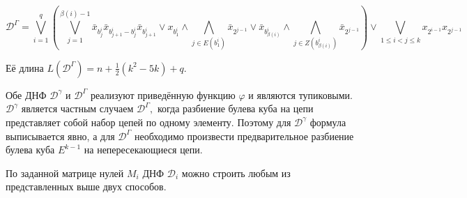 \documentclass[12pt,a4paper,oneside,fleqn,leqno]{article}
\theoremstyle{definition}
\begin{document}
			$$
				\mathcal{D}^{\Gamma} = \bigvee_{i = 1}^q \left(\bigvee_{j = 1}^{\beta(i) - 1} \bar{x}_{b_j^i} \bar{x}_{b_{j + 1}^i - b_j^i} \bar{x}_{b_{j + 1}^i} \vee x_{b_1^i} \wedge \bigwedge_{j \in E(b_1^i)}\bar{x}_{2^{j - 1}} \vee \bar{x}_{b^i_{\beta(i)}} \wedge \bigwedge_{j \in Z(b^i_{\beta(i)})}\bar{x}_{2^{j - 1}} \right)
				 \vee \bigvee_{1 \leqslant i < j \leqslant k} x_{2^{i - 1}} x_{2^{j - 1}}
			$$\par
			Её длина $L(\mathcal{D}^{\Gamma}) = n + \frac{1}{2}(k^2 - 5k) + q.$\par
			Обе ДНФ $\mathcal{D}^{\gamma}$ и $\mathcal{D}^{\Gamma}$ реализуют приведённую функцию $\varphi$ и являются тупиковыми. $\mathcal{D}^{\gamma}$ является частным случаем $\mathcal{D}^{\Gamma},$ когда разбиение булева куба на цепи представляет собой набор цепей по одному элементу. Поэтому для $\mathcal{D}^{\gamma}$ формула выписывается явно, а для $\mathcal{D}^{\Gamma}$ необходимо произвести предварительное разбиение булева куба $E^{k - 1}$ на непересекающиеся цепи.\par
			По заданной матрице нулей $M_i$ ДНФ $\mathcal{D}_i$ можно строить любым из представленных выше двух способов. 
\end{document}
